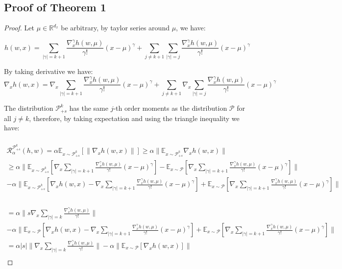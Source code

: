 \subsection{Proof of Theorem 1}
\label{proof_th_1}
\begin{proof}

Let $\mu \in \mathbb{R}^{d_x}$ be arbitrary, by taylor series around $\mu$, we have:

\[
h(w,x) = \sum_{|\gamma|=k+1} \frac{\nabla_x^{\gamma} h(w,\mu)}{\gamma!} (x - \mu)^{\gamma} + \sum_{j \neq k+1}\sum_{|\gamma|=j} \frac{\nabla_x^{\gamma} h(w,\mu)}{\gamma!} (x - \mu)^{\gamma}
\]

By taking derivative we have:
\[
\nabla_x h(w,x) = \nabla_x \sum_{|\gamma|=k+1} \frac{\nabla_x^{\gamma} h(w,\mu)}{\gamma!} (x - \mu)^{\gamma} + \sum_{j \neq k+1} \nabla_x \sum_{|\gamma|=j} \frac{\nabla_x^{\gamma} h(w,\mu)}{\gamma!} (x - \mu)^{\gamma}
\]

The distribution $\mathcal{P}^{k}_{+s}$ has the same $j$-th order moments as the distribution $\mathcal{P}$ for all $j \neq k$, therefore, by taking expectation and using the triangle inequality we have:

\begin{multline*}
    \\
    \mathcal{R}^{\mathcal{P}^{k}_{+s}}_{\alpha}(h,w) = \alpha \mathbb{E}_{x \sim \mathcal{P}^{k}_{+s}} \left[ \| \nabla_x h(w,x) \| \right] \geq \alpha \| \mathbb{E}_{x \sim \mathcal{P}^{k}_{+s}} \nabla_x h(w,x) \| 
    \\
    \geq \alpha \| \mathbb{E}_{x \sim \mathcal{P}^{k}_{+s}} \left[ \nabla_x \sum_{|\gamma|=k+1} \frac{\nabla_x^{\gamma} h(w,\mu)}{\gamma!} (x - \mu)^{\gamma}\right] - \mathbb{E}_{x \sim \mathcal{P}} \left[ \nabla_x \sum_{|\gamma|=k+1} \frac{\nabla_x^{\gamma} h(w,\mu)}{\gamma!} (x - \mu)^{\gamma} \right] \| 
    \\
    - \alpha \| \mathbb{E}_{x \sim \mathcal{P}^{k}_{+s}} \left[ \nabla_x h(w,x) - \nabla_x \sum_{|\gamma|=k+1} \frac{\nabla_x^{\gamma} h(w,\mu)}{\gamma!} (x - \mu)^{\gamma} \right] + \mathbb{E}_{x \sim \mathcal{P}} \left[ \nabla_x \sum_{|\gamma|=k+1} \frac{\nabla_x^{\gamma} h(w,\mu)}{\gamma!} (x - \mu)^{\gamma} \right]\|
    \\
\end{multline*}

\begin{multline*}
    \\
    = \alpha \| s \nabla_x \sum_{|\gamma|=k} \frac{\nabla_x^{\gamma} h(w,\mu)}{\gamma!} \|
    \\
    - \alpha \| \mathbb{E}_{x \sim \mathcal{P}} \left[ \nabla_x h(w,x) - \nabla_x \sum_{|\gamma|=k+1} \frac{\nabla_x^{\gamma} h(w,\mu)}{\gamma!} (x - \mu)^{\gamma} \right] + \mathbb{E}_{x \sim \mathcal{P}} \left[ \nabla_x \sum_{|\gamma|=k+1} \frac{\nabla_x^{\gamma} h(w,\mu)}{\gamma!} (x - \mu)^{\gamma} \right]\|
    \\
    = \alpha |s| \| \nabla_x \sum_{|\gamma|=k} \frac{\nabla_x^{\gamma} h(w,\mu)}{\gamma!} \|
    - \alpha \| \mathbb{E}_{x \sim \mathcal{P}} \left[ \nabla_x h(w,x) \right]\|
    \\
\end{multline*}


\end{proof}
